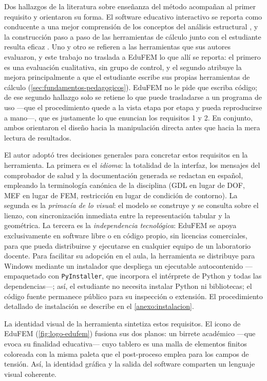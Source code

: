 Dos hallazgos de la literatura sobre enseñanza del método acompañan al primer requisito y orientaron su forma. El software educativo interactivo se reporta como conducente a una mejor comprensión de los conceptos del análisis estructural \autocite[p.~168]{lee2015interactive}, y la construcción paso a paso de las herramientas de cálculo junto con el estudiante resulta eficaz \autocite[p.~1023]{bishay2020teaching}. Uno y otro se refieren a las herramientas que sus autores evaluaron, y este trabajo no traslada a EduFEM lo que allí se reporta: el primero es una evaluación cualitativa, sin grupo de control, y el segundo atribuye la mejora principalmente a que el estudiante escribe sus propias herramientas de cálculo (\autoref{sec:fundamentos-pedagogicos}). EduFEM no le pide que escriba código; de ese segundo hallazgo solo se retiene lo que puede trasladarse a un programa de uso —que el procedimiento quede a la vista etapa por etapa y pueda reproducirse a mano—, que es justamente lo que enuncian los requisitos 1 y 2. En conjunto, ambos orientaron el diseño hacia la manipulación directa antes que hacia la mera lectura de resultados.

El autor adoptó tres decisiones generales para concretar estos requisitos en la herramienta. La primera es el \emph{idioma}: la totalidad de la interfaz, los mensajes del comprobador de salud y la documentación generada se redactan en español, empleando la terminología canónica de la disciplina (GDL en lugar de DOF, MEF en lugar de FEM, restricción en lugar de condición de contorno). La segunda es la \emph{primacía de lo visual}: el modelo se construye y se consulta sobre el lienzo, con sincronización inmediata entre la representación tabular y la geométrica. La tercera es la \emph{independencia tecnológica}: EduFEM se apoya exclusivamente en software libre o en código propio, sin licencias comerciales, para que pueda distribuirse y ejecutarse en cualquier equipo de un laboratorio docente. Para facilitar su adopción en el aula, la herramienta se distribuye para Windows mediante un instalador que despliega un ejecutable autocontenido —empaquetado con \texttt{PyInstaller}, que incorpora el intérprete de Python y todas las dependencias—; así, el estudiante no necesita instalar Python ni bibliotecas; el código fuente permanece público para su inspección o extensión. El procedimiento detallado de instalación se describe en el \autoref{anexo:instalacion}.

La identidad visual de la herramienta sintetiza estos requisitos. El icono de EduFEM (\autoref{fig:logo-edufem}) fusiona sus dos planos: un birrete académico —que evoca su finalidad educativa— cuyo tablero es una malla de elementos finitos coloreada con la misma paleta que el post-proceso emplea para los campos de tensión. Así, la identidad gráfica y la salida del software comparten un lenguaje visual coherente.

